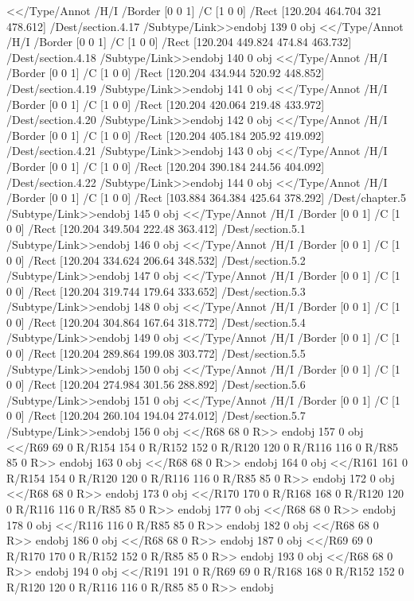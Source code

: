 {{{{{{{{{{{{{{{{{{{{{{{{{{{{<</Type/Annot
/H/I
/Border [0 0 1]
/C [1 0 0]
/Rect [120.204 464.704 321 478.612]
/Dest/section.4.17
/Subtype/Link>>endobj
139 0 obj
<</Type/Annot
/H/I
/Border [0 0 1]
/C [1 0 0]
/Rect [120.204 449.824 474.84 463.732]
/Dest/section.4.18
/Subtype/Link>>endobj
140 0 obj
<</Type/Annot
/H/I
/Border [0 0 1]
/C [1 0 0]
/Rect [120.204 434.944 520.92 448.852]
/Dest/section.4.19
/Subtype/Link>>endobj
141 0 obj
<</Type/Annot
/H/I
/Border [0 0 1]
/C [1 0 0]
/Rect [120.204 420.064 219.48 433.972]
/Dest/section.4.20
/Subtype/Link>>endobj
142 0 obj
<</Type/Annot
/H/I
/Border [0 0 1]
/C [1 0 0]
/Rect [120.204 405.184 205.92 419.092]
/Dest/section.4.21
/Subtype/Link>>endobj
143 0 obj
<</Type/Annot
/H/I
/Border [0 0 1]
/C [1 0 0]
/Rect [120.204 390.184 244.56 404.092]
/Dest/section.4.22
/Subtype/Link>>endobj
144 0 obj
<</Type/Annot
/H/I
/Border [0 0 1]
/C [1 0 0]
/Rect [103.884 364.384 425.64 378.292]
/Dest/chapter.5
/Subtype/Link>>endobj
145 0 obj
<</Type/Annot
/H/I
/Border [0 0 1]
/C [1 0 0]
/Rect [120.204 349.504 222.48 363.412]
/Dest/section.5.1
/Subtype/Link>>endobj
146 0 obj
<</Type/Annot
/H/I
/Border [0 0 1]
/C [1 0 0]
/Rect [120.204 334.624 206.64 348.532]
/Dest/section.5.2
/Subtype/Link>>endobj
147 0 obj
<</Type/Annot
/H/I
/Border [0 0 1]
/C [1 0 0]
/Rect [120.204 319.744 179.64 333.652]
/Dest/section.5.3
/Subtype/Link>>endobj
148 0 obj
<</Type/Annot
/H/I
/Border [0 0 1]
/C [1 0 0]
/Rect [120.204 304.864 167.64 318.772]
/Dest/section.5.4
/Subtype/Link>>endobj
149 0 obj
<</Type/Annot
/H/I
/Border [0 0 1]
/C [1 0 0]
/Rect [120.204 289.864 199.08 303.772]
/Dest/section.5.5
/Subtype/Link>>endobj
150 0 obj
<</Type/Annot
/H/I
/Border [0 0 1]
/C [1 0 0]
/Rect [120.204 274.984 301.56 288.892]
/Dest/section.5.6
/Subtype/Link>>endobj
151 0 obj
<</Type/Annot
/H/I
/Border [0 0 1]
/C [1 0 0]
/Rect [120.204 260.104 194.04 274.012]
/Dest/section.5.7
/Subtype/Link>>endobj
156 0 obj
<</R68
68 0 R>>
endobj
157 0 obj
<</R69
69 0 R/R154
154 0 R/R152
152 0 R/R120
120 0 R/R116
116 0 R/R85
85 0 R>>
endobj
163 0 obj
<</R68
68 0 R>>
endobj
164 0 obj
<</R161
161 0 R/R154
154 0 R/R120
120 0 R/R116
116 0 R/R85
85 0 R>>
endobj
172 0 obj
<</R68
68 0 R>>
endobj
173 0 obj
<</R170
170 0 R/R168
168 0 R/R120
120 0 R/R116
116 0 R/R85
85 0 R>>
endobj
177 0 obj
<</R68
68 0 R>>
endobj
178 0 obj
<</R116
116 0 R/R85
85 0 R>>
endobj
182 0 obj
<</R68
68 0 R>>
endobj
186 0 obj
<</R68
68 0 R>>
endobj
187 0 obj
<</R69
69 0 R/R170
170 0 R/R152
152 0 R/R85
85 0 R>>
endobj
193 0 obj
<</R68
68 0 R>>
endobj
194 0 obj
<</R191
191 0 R/R69
69 0 R/R168
168 0 R/R152
152 0 R/R120
120 0 R/R116
116 0 R/R85
85 0 R>>
endobj
}}}}}}}}}}}}}}}}}}}}}}}}}}}}
